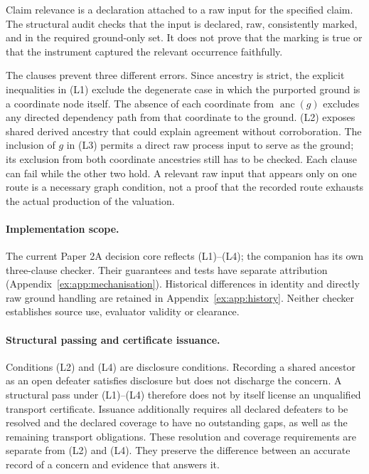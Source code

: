 \documentclass[11pt]{article}
\theoremstyle{definition}
\begin{document}
Claim relevance is a declaration attached to a raw input for the specified claim. The structural audit checks that the input is declared, raw, consistently marked, and in the required ground-only set. It does not prove that the marking is true or that the instrument captured the relevant occurrence faithfully.

The clauses prevent three different errors. Since ancestry is strict, the explicit inequalities in (L1) exclude the degenerate case in which the purported ground is a coordinate node itself. The absence of each coordinate from $\operatorname{anc}(g)$ excludes any directed dependency path from that coordinate to the ground. (L2) exposes shared derived ancestry that could explain agreement without corroboration. The inclusion of $g$ in (L3) permits a direct raw process input to serve as the ground; its exclusion from both coordinate ancestries still has to be checked. Each clause can fail while the other two hold. A relevant raw input that appears only on one route is a necessary graph condition, not a proof that the recorded route exhausts the actual production of the valuation.

\paragraph{Implementation scope.}
The current Paper 2A decision core reflects (L1)--(L4); the companion has its own three-clause checker. Their guarantees and tests have separate attribution (Appendix~\ref{ex:app:mechanisation}). Historical differences in identity and directly raw ground handling are retained in Appendix~\ref{ex:app:history}. Neither checker establishes source use, evaluator validity or clearance.

\paragraph{Structural passing and certificate issuance.}
Conditions (L2) and (L4) are disclosure conditions. Recording a shared ancestor as an open defeater satisfies disclosure but does not discharge the concern. A structural pass under (L1)--(L4) therefore does not by itself license an unqualified transport certificate. Issuance additionally requires all declared defeaters to be resolved and the declared coverage to have no outstanding gaps, as well as the remaining transport obligations. These resolution and coverage requirements are separate from (L2) and (L4). They preserve the difference between an accurate record of a concern and evidence that answers it.
\end{document}

